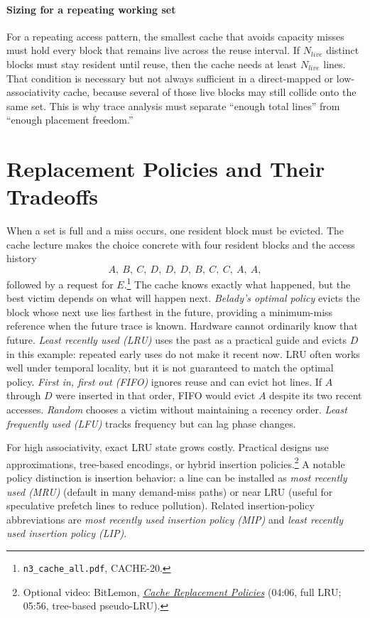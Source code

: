 \paragraph{Sizing for a repeating working set}\label{par:auto-019a}
For a repeating access pattern, the smallest cache that avoids capacity misses must hold every block that remains live across the reuse interval.
If $N_{live}$ distinct blocks must stay resident until reuse, then the cache needs at least $N_{live}$ lines.
That condition is necessary but not always sufficient in a direct-mapped or low-associativity cache, because several of those live blocks may still collide onto the same set.
This is why trace analysis must separate ``enough total lines'' from ``enough placement freedom.''


\section{Replacement Policies and Their Tradeoffs}\label{sec:auto-026}
When a set is full and a miss occurs, one resident block must be evicted.
The cache lecture makes the choice concrete with four resident blocks and the access history
\[
    A,\ B,\ C,\ D,\ D,\ D,\ B,\ C,\ C,\ A,\ A,
\]
followed by a request for $E$.\footnote{\texttt{n3\_cache\_all.pdf}, CACHE-20.}
The cache knows exactly what happened, but the best victim depends on what will happen next.
\textit{Belady's optimal policy} evicts the block whose next use lies farthest in the future, providing a minimum-miss reference when the future trace is known.
Hardware cannot ordinarily know that future.
\textit{Least recently used (LRU)} uses the past as a practical guide and evicts $D$ in this example: repeated early uses do not make it recent now.
LRU often works well under temporal locality, but it is not guaranteed to match the optimal policy.
\textit{First in, first out (FIFO)} ignores reuse and can evict hot lines.
If $A$ through $D$ were inserted in that order, FIFO would evict $A$ despite its two recent accesses.
\textit{Random} chooses a victim without maintaining a recency order.
\textit{Least frequently used (LFU)} tracks frequency but can lag phase changes.

For high associativity, exact LRU state grows costly.
Practical designs use approximations, tree-based encodings, or hybrid insertion policies.\footnote{Optional video: BitLemon, \href{https://youtu.be/P_UYI23DddU?t=246}{\emph{Cache Replacement Policies}} (04:06, full LRU; 05:56, tree-based pseudo-LRU).}
A notable policy distinction is insertion behavior: a line can be installed as \textit{most recently used (MRU)} (default in many demand-miss paths) or near LRU (useful for speculative prefetch lines to reduce pollution).
Related insertion-policy abbreviations are \textit{most recently used insertion policy (MIP)} and \textit{least recently used insertion policy (LIP)}.

